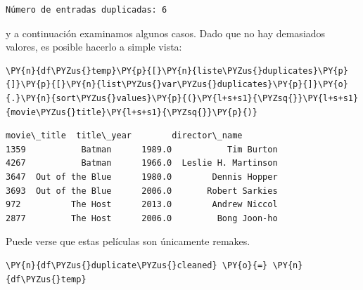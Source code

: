     \begin{Verbatim}[commandchars=\\\{\}]
Número de entradas duplicadas: 6
\end{Verbatim}

    y a continuación examinamos algunos casos. Dado que no hay demasiados
valores, es posible hacerlo a simple vista:

    \begin{tcolorbox}[breakable, size=fbox, boxrule=1pt, pad at break*=1mm,colback=cellbackground, colframe=cellborder]
\begin{Verbatim}[commandchars=\\\{\}]
\PY{n}{df\PYZus{}temp}\PY{p}{[}\PY{n}{liste\PYZus{}duplicates}\PY{p}{]}\PY{p}{[}\PY{n}{list\PYZus{}var\PYZus{}duplicates}\PY{p}{]}\PY{o}{.}\PY{n}{sort\PYZus{}values}\PY{p}{(}\PY{l+s+s1}{\PYZsq{}}\PY{l+s+s1}{movie\PYZus{}title}\PY{l+s+s1}{\PYZsq{}}\PY{p}{)}
\end{Verbatim}
\end{tcolorbox}

            \begin{tcolorbox}[breakable, boxrule=.5pt, size=fbox, pad at break*=1mm, opacityfill=0]
\begin{Verbatim}[commandchars=\\\{\}]
          movie\_title  title\_year        director\_name
1359           Batman      1989.0           Tim Burton
4267           Batman      1966.0  Leslie H. Martinson
3647  Out of the Blue      1980.0        Dennis Hopper
3693  Out of the Blue      2006.0       Robert Sarkies
972          The Host      2013.0        Andrew Niccol
2877         The Host      2006.0         Bong Joon-ho
\end{Verbatim}
\end{tcolorbox}
        
    Puede verse que estas películas son únicamente remakes.

    \begin{tcolorbox}[breakable, size=fbox, boxrule=1pt, pad at break*=1mm,colback=cellbackground, colframe=cellborder]
\begin{Verbatim}[commandchars=\\\{\}]
\PY{n}{df\PYZus{}duplicate\PYZus{}cleaned} \PY{o}{=} \PY{n}{df\PYZus{}temp}
\end{Verbatim}
\end{tcolorbox}

